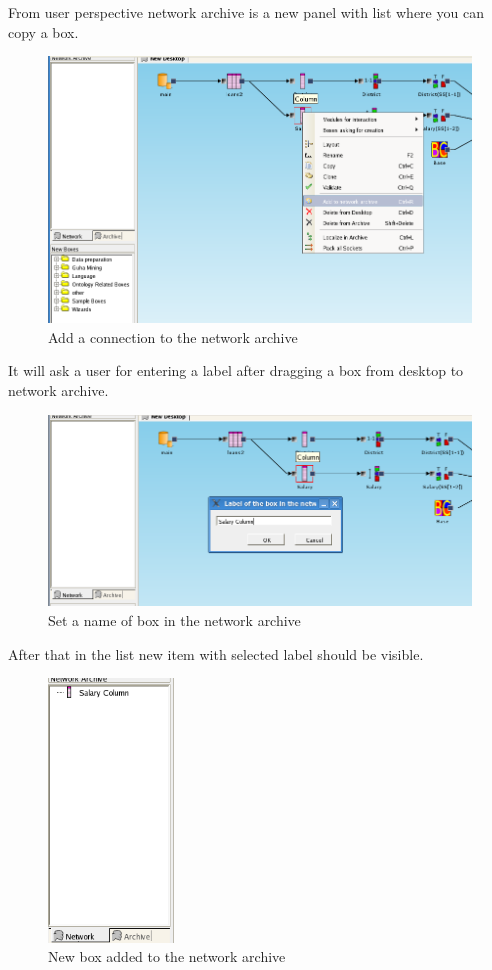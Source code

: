 \documentclass{article}
\begin{document}
From user perspective network archive is a new panel with list where you can copy a box.
\begin{figure}
	\includegraphics[width=12cm]{add_to_network_archive}
	\caption{Add a connection to the network archive}
\end{figure}
It will ask a user for entering a label after dragging a box from desktop to network archive.
\begin{figure}
	\includegraphics[width=12cm]{set_name_of_box_in_network_archive}
	\caption{Set a name of box in the network archive}
\end{figure}
After that in the list new item with selected label should be visible.
\begin{figure}
	\includegraphics[height=7cm]{network_archive_box_added}
	\caption{New box added to the network archive}
\end{figure}
\end{document}
